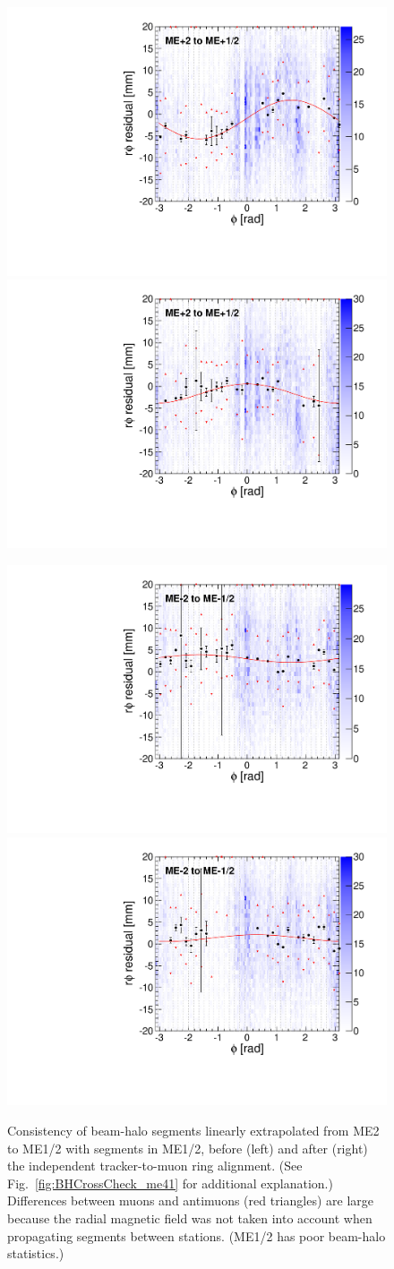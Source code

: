 \documentclass[12pt]{article}
\begin{document}
\begin{figure}
\begin{center}
\includegraphics[width=0.4\linewidth]{BHCrossCheck_mep12_before.pdf}
\includegraphics[width=0.4\linewidth]{BHCrossCheck_mep12_after.pdf}

\includegraphics[width=0.4\linewidth]{BHCrossCheck_mem12_before.pdf}
\includegraphics[width=0.4\linewidth]{BHCrossCheck_mem12_after.pdf}
\end{center}

\caption{Consistency of beam-halo segments linearly extrapolated from
  ME2 to ME1/2 with segments in ME1/2, before (left) and after
  (right) the independent tracker-to-muon ring alignment.  (See
  Fig.~\ref{fig:BHCrossCheck_me41} for additional explanation.)
  Differences between muons and antimuons (red triangles) are large
  because the radial magnetic field was not taken into account when
  propagating segments between stations.  (ME1/2 has poor beam-halo
  statistics.) \label{fig:BHCrossCheck_me12}}
\end{figure}
\end{document}
